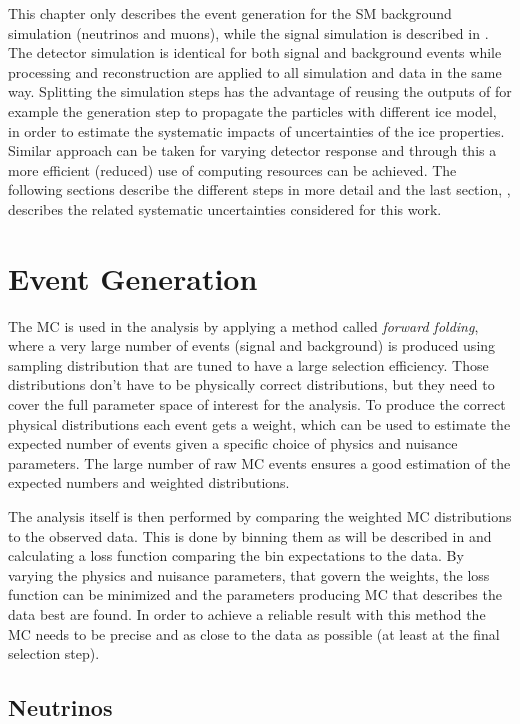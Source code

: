 This chapter only describes the event generation for the SM background simulation (neutrinos and muons), while the signal simulation is described in . The detector simulation is identical for both signal and background events while processing and reconstruction are applied to all simulation and data in the same way. Splitting the simulation steps has the advantage of reusing the outputs of for example the generation step to propagate the particles with different ice model, in order to estimate the systematic impacts of uncertainties of the ice properties. Similar approach can be taken for varying detector response and through this a more efficient (reduced) use of computing resources can be achieved. The following sections describe the different steps in more detail and the last section, , describes the related systematic uncertainties considered for this work.


\section{Event Generation} 

The MC is used in the analysis by applying a method called \textit{forward folding}, where a very large number of events (signal and background) is produced using sampling distribution that are tuned to have a large selection efficiency. Those distributions don't have to be physically correct distributions, but they need to cover the full parameter space of interest for the analysis. To produce the correct physical distributions each event gets a weight, which can be used to estimate the expected number of events given a specific choice of physics and nuisance parameters. The large number of raw MC events ensures a good estimation of the expected numbers and weighted distributions. 

The analysis itself is then performed by comparing the weighted MC distributions to the observed data. This is done by binning them as will be described in  and calculating a loss function comparing the bin expectations to the data. By varying the physics and nuisance parameters, that govern the weights, the loss function can be minimized and the parameters producing MC that describes the data best are found. In order to achieve a reliable result with this method the MC needs to be precise and as close to the data as possible (at least at the final selection step). 


\subsection{Neutrinos}

